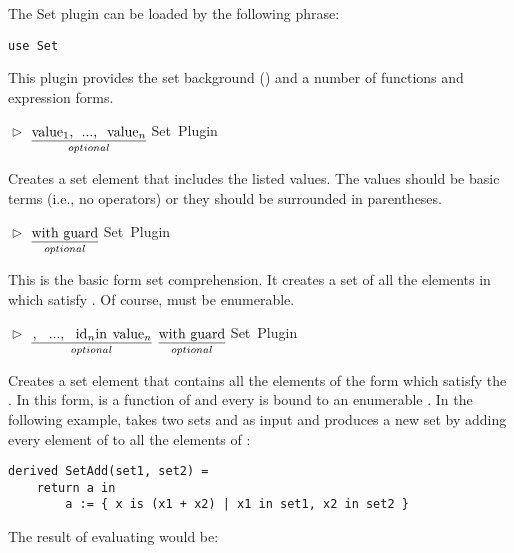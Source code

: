 \documentclass{article}
\newcommand{\opform}[2]{\pform{$\vartriangleright$}{#1}{#2}}
\newcommand{\pform}[3]{\vspace*{4mm} \noindent #1 #2 \vspace{1mm}\textcolor[gray]{0.7}{\dotfill}\mbox{{\sffamily \footnotesize #3}}}
\newcommand{\optional}[1]{$\underset{optional}{\underline{\mbox{#1}}}$}
\begin{document}
The Set plugin can be loaded by the following  phrase:

\begin{lstlisting}
use Set
\end{lstlisting}

\noindent This plugin provides the set background () and a number of functions and expression forms. 

\opform{
	\asm{\{}
	\optional{\asm{value$_1$, ..., value$_n$}}
	\asm{\}}
}{Set Plugin}

Creates a set element that includes the listed values. The values should be basic terms (i.e., no operators) or
they should be surrounded in parentheses.

\opform{
	 \textbar {}
	\optional{\asm{with guard}}
	\asm{\}}
}{Set Plugin}

This is the basic form set comprehension. It creates a set of all the elements in  which satisfy . Of course,  must be enumerable.

\opform{
	 \textbar {}\hspace{-.4em}
	\optional{\asm{, ..., id$_n$ in value$_n$}}
	\optional{\asm{with guard}}
	\asm{\}}
}{Set Plugin}

Creates a set element that contains all the elements of the form  which satisfy the . In this form,  is a function of  and every  is bound to an enumerable . 
In the following example,  takes two sets  and  as input and produces a new set by adding every element of  to all the elements of :   

\begin{lstlisting}
derived SetAdd(set1, set2) =
	return a in
		a := { x is (x1 + x2) | x1 in set1, x2 in set2 } 
\end{lstlisting}

The result of evaluating  would be:

\begin{quote}  \end{quote}
\end{document}
